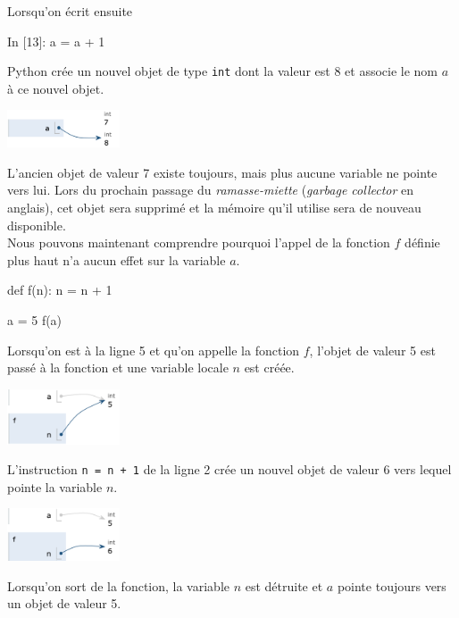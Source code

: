 \documentclass{magnolia}
\begin{document}
\noindent Lorsqu'on écrit ensuite

\begin{pythoncode}
In [13]: a = a + 1   
\end{pythoncode}
\noindent
Python crée un nouvel objet de type \verb_int_ dont la valeur est 8 et associe le nom $a$ à ce nouvel objet.

\begin{center}
\includegraphics[width=0.25\textwidth]{../../Commun/Images/python-cours-tutor-2}
\end{center}
\noindent
L'ancien objet de valeur 7 existe toujours, mais plus aucune variable ne pointe vers lui. Lors du prochain passage
du \emph{ramasse-miette} (\emph{garbage collector} en anglais), cet objet sera supprimé et la mémoire qu'il utilise
sera de nouveau disponible.\\

Nous pouvons maintenant comprendre pourquoi l'appel de la fonction $f$ définie plus haut n'a aucun effet sur
la variable $a$.

\begin{pythoncode}
def f(n):
    n = n + 1

a = 5
f(a)
\end{pythoncode}
Lorsqu'on est à la ligne 5 et qu'on appelle la fonction $f$, l'objet de valeur 5 est passé à la fonction
et une variable locale $n$ est créée.

\begin{center}
\includegraphics[width=0.25\textwidth]{../../Commun/Images/python-cours-tutor-4}
\end{center}
\noindent
L'instruction \verb!n = n + 1! de la ligne 2 crée un nouvel objet de valeur 6 vers lequel pointe la
variable $n$.
\begin{center}
\includegraphics[width=0.25\textwidth]{../../Commun/Images/python-cours-tutor-5}
\end{center}
\noindent
Lorsqu'on sort de la fonction, la variable $n$ est détruite et $a$ pointe toujours vers un objet
de valeur 5.\\
\end{document}
